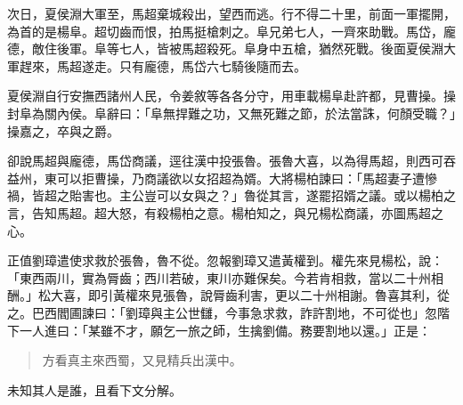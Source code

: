次日，夏侯淵大軍至，馬超棄城殺出，望西而逃。行不得二十里，前面一軍擺開，為首的是楊阜。超切齒而恨，拍馬挺槍刺之。阜兄弟七人，一齊來助戰。馬岱，龐德，敵住後軍。阜等七人，皆被馬超殺死。阜身中五槍，猶然死戰。後面夏侯淵大軍趕來，馬超遂走。只有龐德，馬岱六七騎後隨而去。

夏侯淵自行安撫西諸州人民，令姜敘等各各分守，用車載楊阜赴許都，見曹操。操封阜為關內侯。阜辭曰：「阜無捍難之功，又無死難之節，於法當誅，何顏受職？」操嘉之，卒與之爵。

卻說馬超與龐德，馬岱商議，逕往漢中投張魯。張魯大喜，以為得馬超，則西可吞益州，東可以拒曹操，乃商議欲以女招超為婿。大將楊柏諫曰：「馬超妻子遭慘禍，皆超之貽害也。主公豈可以女與之？」魯從其言，遂罷招婿之議。或以楊柏之言，告知馬超。超大怒，有殺楊柏之意。楊柏知之，與兄楊松商議，亦圖馬超之心。

正值劉璋遣使求救於張魯，魯不從。忽報劉璋又遣黃權到。權先來見楊松，說：「東西兩川，實為脣齒；西川若破，東川亦難保矣。今若肯相救，當以二十州相酬。」松大喜，即引黃權來見張魯，說脣齒利害，更以二十州相謝。魯喜其利，從之。巴西閻圃諫曰：「劉璋與主公世讎，今事急求救，詐許割地，不可從也」忽階下一人進曰：「某雖不才，願乞一旅之師，生擒劉備。務要割地以還。」正是：

\begin{quote}
方看真主來西蜀，又見精兵出漢中。
\end{quote}

未知其人是誰，且看下文分解。
